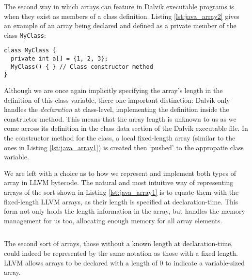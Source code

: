 The second way in which arrays can feature in Dalvik executable programs is when they exist as members of a class definition. Listing \ref{lst:java_array2} gives an example of an array being declared and defined as a private member of the class \verb|MyClass|:

\begin{lstlisting}[frame=single, caption={Arrays as class members in Java}, label={lst:java_array2}]
class MyClass {
  private int a[] = {1, 2, 3};
  MyClass() { } // Class constructor method
}
\end{lstlisting}

Although we are once again implicitly specifying the array's length in the definition of this class variable, there one important distinction: Dalvik only handles the \textit{declaration} at class-level, implementing the definition inside the constructor method. This means that the array length is unknown to us as we come across its definition in the class data section of the Dalvik executable file. In the constructor method for the class, a local fixed-length array (similar to the ones in Listing \ref{lst:java_array1}) is created then `pushed' to the appropatie class variable.

We are left with a choice as to how we represent and implement both types of array in LLVM bytecode. The natural and most intuitive way of representing arrays of the sort shown in Listing \ref{lst:java_array1} is to equate them with the fixed-length LLVM arrays, as their length is specified at declaration-time. This form not only holds the length information in the array, but handles the memory management for us too, allocating enough memory for all array elements.

\lstset{
	language=Assembly,
	basicstyle=\small,
	stringstyle=\ttfamily
}

\begin{lstlisting}[frame=single, caption={LLVM fixed-length array}, label=lst:llvm_fix]
%a = [3 x i32]
\end{lstlisting}

The second sort of arrays, those without a known length at declaration-time, could indeed be represented by the same notation as those with a fixed length. LLVM allows arrays to be declared with a length of 0 to indicate a variable-sized array.

\begin{lstlisting}[frame=single, caption={LLVM variable-length array}, label=lst:llvm_var]
%a = [0 x i32]
\end{lstlisting}

